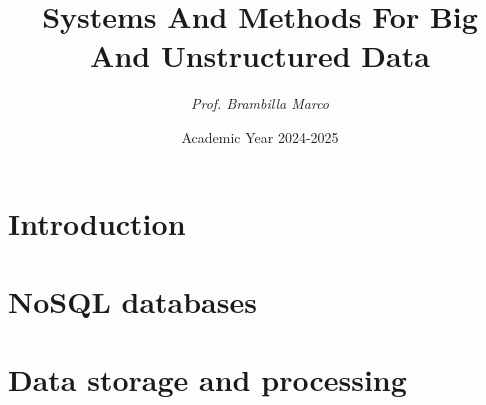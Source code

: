 \documentclass[12pt, a4paper]{report}
\title{\textbf{Systems And Methods For Big And Unstructured Data}}
\author{\textit{Prof. Brambilla Marco}}
\date{Academic Year 2024-2025}
\begin{document}
    \maketitle

    

    \cleardoublepage

    \tableofcontents

    \cleardoublepage

    \chapter{Introduction}
    
    
    
    

    \chapter{NoSQL databases}
    
    
    
    
    
    

    \chapter{Data storage and processing}
    
    
    
\end{document}
